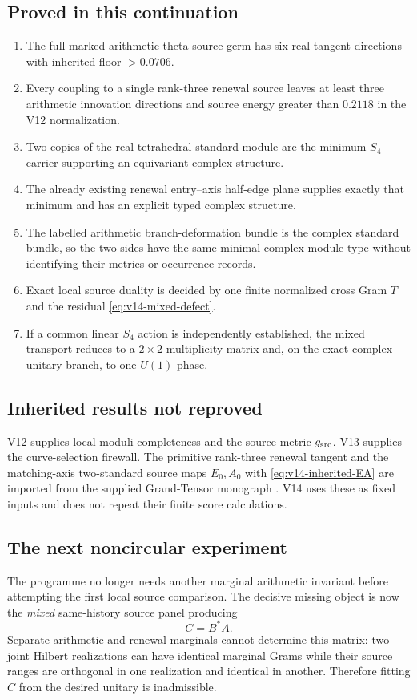\documentclass[11pt]{article}
\theoremstyle{definition}
\theoremstyle{remark}
\begin{document}
\subsection{Proved in this continuation}
\begin{enumerate}[leftmargin=2.2em]
\item The full marked arithmetic theta-source germ has six real tangent
      directions with inherited floor $>0.0706$.
\item Every coupling to a single rank-three renewal source leaves at least
      three arithmetic innovation directions and source energy greater than
      $0.2118$ in the V12 normalization.
\item Two copies of the real tetrahedral standard module are the minimum
      $S_4$ carrier supporting an equivariant complex structure.
\item The already existing renewal entry--axis half-edge plane supplies
      exactly that minimum and has an explicit typed complex structure.
\item The labelled arithmetic branch-deformation bundle is the complex
      standard bundle, so the two sides have the same minimal complex module
      type without identifying their metrics or occurrence records.
\item Exact local source duality is decided by one finite normalized cross
      Gram $T$ and the residual \eqref{eq:v14-mixed-defect}.
\item If a common linear $S_4$ action is independently established, the mixed
      transport reduces to a $2\times2$ multiplicity matrix and, on the exact
      complex-unitary branch, to one $U(1)$ phase.
\end{enumerate}

\subsection{Inherited results not reproved}
V12 supplies local moduli completeness and the source metric
$g_{\rm src}$.  V13 supplies the curve-selection firewall.  The primitive
rank-three renewal tangent and the matching-axis two-standard source maps
$E_0,A_0$ with \eqref{eq:v14-inherited-EA} are imported from the supplied
Grand-Tensor monograph \cite{GT77}.  V14 uses these as fixed inputs and does
not repeat their finite score calculations.

\subsection{The next noncircular experiment}
The programme no longer needs another marginal arithmetic invariant before
attempting the first local source comparison.  The decisive missing object is
now the \emph{mixed} same-history source panel producing
\[
 C=B^*A.
\]
Separate arithmetic and renewal marginals cannot determine this matrix: two
joint Hilbert realizations can have identical marginal Grams while their
source ranges are orthogonal in one realization and identical in another.
Therefore fitting $C$ from the desired unitary is inadmissible.
\end{document}

